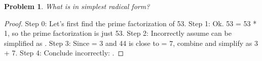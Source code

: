 \documentclass{article}
\newtheorem{theorem}{Problem}
\begin{document}
\begin{theorem}
What is  in simplest radical form?
\end{theorem}

\begin{proof}
Step 0: Let's first find the prime factorization of 53.
Step 1: Ok. 53 = 53 * 1, so the prime factorization is just 53.
Step 2: Incorrectly assume  can be simplified as .
Step 3: Since  = 3 and 44 is close to  = 7, combine and simplify as 3 + 7.
Step 4: Conclude incorrectly:  .
\end{proof}
\end{document}
